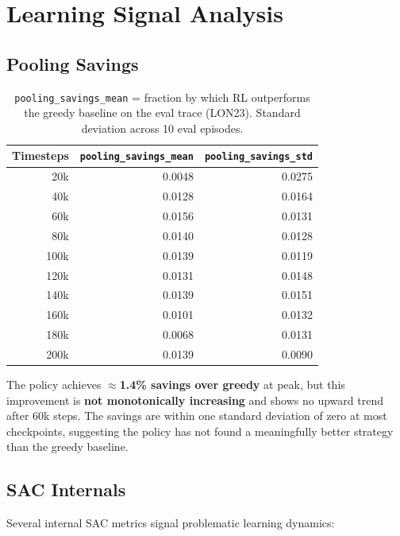 \documentclass[11pt]{article}
\begin{document}
\section{Learning Signal Analysis}

\subsection{Pooling Savings}

\begin{table}[h]
\centering
\begin{tabular}{rrr}
\toprule
Timesteps & \texttt{pooling\_savings\_mean} & \texttt{pooling\_savings\_std} \\
\midrule
20k  & 0.0048 & 0.0275 \\
40k  & 0.0128 & 0.0164 \\
60k  & 0.0156 & 0.0131 \\
80k  & 0.0140 & 0.0128 \\
100k & 0.0139 & 0.0119 \\
120k & 0.0131 & 0.0148 \\
140k & 0.0139 & 0.0151 \\
160k & 0.0101 & 0.0132 \\
180k & 0.0068 & 0.0131 \\
200k & 0.0139 & 0.0090 \\
\bottomrule
\end{tabular}
\caption{\texttt{pooling\_savings\_mean} = fraction by which RL outperforms
the greedy baseline on the eval trace (LON23). Standard deviation across
10 eval episodes.}
\end{table}

The policy achieves \textbf{$\approx$1.4\% savings over greedy} at
peak, but this improvement is \textbf{not monotonically increasing} and
shows no upward trend after 60k steps. The savings are within one
standard deviation of zero at most checkpoints, suggesting the policy
has not found a meaningfully better strategy than the greedy baseline.

\subsection{SAC Internals}

Several internal SAC metrics signal problematic learning dynamics:
\end{document}
